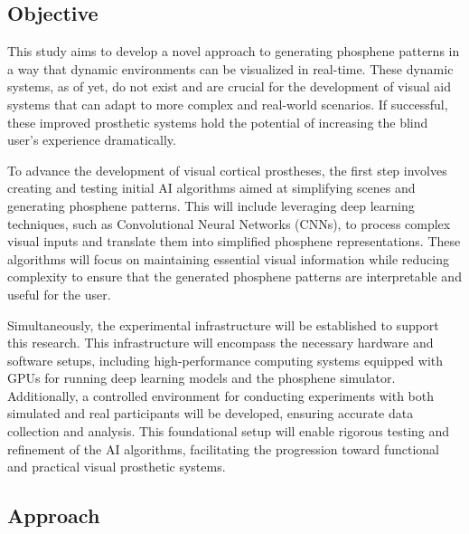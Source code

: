 \documentclass[10pt]{article}
\begin{document}
\subsection*{Objective}\label{subsec:objective}
This study aims to develop a novel approach to generating phosphene patterns in
a way that dynamic environments can be visualized in real-time. These dynamic
systems, as of yet, do not exist and are crucial for the development of visual
aid systems that can adapt to more complex and real-world scenarios. If
successful, these improved prosthetic systems hold the potential of increasing
the blind user's experience dramatically.

To advance the development of visual cortical prostheses, the first step
involves creating and testing initial AI algorithms aimed at simplifying scenes
and generating phosphene patterns. This will include leveraging deep learning
techniques, such as Convolutional Neural Networks (CNNs), to process complex
visual inputs and translate them into simplified phosphene representations.
These algorithms will focus on maintaining essential visual information while
reducing complexity to ensure that the generated phosphene patterns are
interpretable and useful for the user.

Simultaneously, the experimental infrastructure will be established to support
this research. This infrastructure will encompass the necessary hardware and
software setups, including high-performance computing systems equipped with GPUs
for running deep learning models and the phosphene simulator. Additionally, a
controlled environment for conducting experiments with both simulated and real
participants will be developed, ensuring accurate data collection and analysis.
This foundational setup will enable rigorous testing and refinement of the AI
algorithms, facilitating the progression toward functional and practical visual
prosthetic systems.

\subsection*{Approach}\label{subsec:approach}
\end{document}
